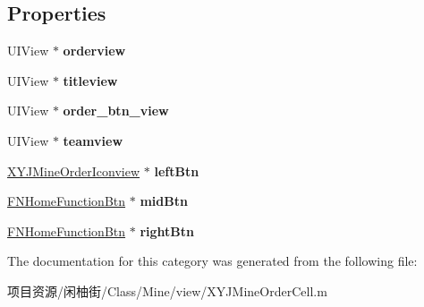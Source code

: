 \subsection*{Properties}
\begin{DoxyCompactItemize}
\item 
\mbox{\label{category_x_y_j_mine_order_cell_07_08_a98a09a0f806bfa98ff8a6e936be88758}} 
U\+I\+View $\ast$ {\bfseries orderview}
\item 
\mbox{\label{category_x_y_j_mine_order_cell_07_08_ab584f59a698ec176a0a827cb869d262f}} 
U\+I\+View $\ast$ {\bfseries titleview}
\item 
\mbox{\label{category_x_y_j_mine_order_cell_07_08_ab18f81c9db18053b4d17bb8c38493417}} 
U\+I\+View $\ast$ {\bfseries order\+\_\+btn\+\_\+view}
\item 
\mbox{\label{category_x_y_j_mine_order_cell_07_08_a6d94291c9b75f223377dcc9f05212602}} 
U\+I\+View $\ast$ {\bfseries teamview}
\item 
\mbox{\label{category_x_y_j_mine_order_cell_07_08_a50459c1c9e91aa90ed6b0f5fc32c9d0f}} 
\mbox{\hyperlink{interface_x_y_j_mine_order_iconview}{X\+Y\+J\+Mine\+Order\+Iconview}} $\ast$ {\bfseries left\+Btn}
\item 
\mbox{\label{category_x_y_j_mine_order_cell_07_08_a229a68a4aa1b1c0e2ac623a975241c88}} 
\mbox{\hyperlink{interface_f_n_home_function_btn}{F\+N\+Home\+Function\+Btn}} $\ast$ {\bfseries mid\+Btn}
\item 
\mbox{\label{category_x_y_j_mine_order_cell_07_08_ab87598f17051035b98292d1017a8cf96}} 
\mbox{\hyperlink{interface_f_n_home_function_btn}{F\+N\+Home\+Function\+Btn}} $\ast$ {\bfseries right\+Btn}
\end{DoxyCompactItemize}


The documentation for this category was generated from the following file\+:\begin{DoxyCompactItemize}
\item 
项目资源/闲柚街/\+Class/\+Mine/view/X\+Y\+J\+Mine\+Order\+Cell.\+m\end{DoxyCompactItemize}
